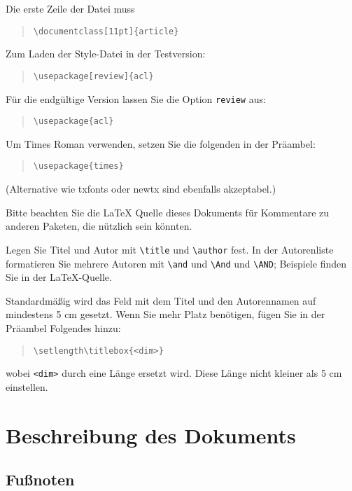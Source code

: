 \documentclass[11pt]{article}
\begin{document}
Die erste Zeile der Datei muss
\begin{quote}
\begin{verbatim}
\documentclass[11pt]{article}
\end{verbatim}
\end{quote}

Zum Laden der Style-Datei in der Testversion:
\begin{quote}
\begin{verbatim}
\usepackage[review]{acl}
\end{verbatim}
\end{quote}
Für die endgültige Version lassen Sie die Option \verb|review| aus:
\begin{quote}
\begin{verbatim}
\usepackage{acl}
\end{verbatim}
\end{quote}

Um Times Roman verwenden, setzen Sie die folgenden in der Präambel:
\begin{quote}
\begin{verbatim}
\usepackage{times}
\end{verbatim}
\end{quote}
(Alternative wie txfonts oder newtx sind ebenfalls akzeptabel.)

Bitte beachten Sie die \LaTeX{} Quelle dieses Dokuments für Kommentare zu anderen Paketen, die nützlich sein könnten.

Legen Sie Titel und Autor mit \verb|\title| und \verb|\author| fest. In der Autorenliste formatieren Sie mehrere Autoren mit \verb|\and| und \verb|\And| und \verb|\AND|; Beispiele finden Sie in der \LaTeX{}-Quelle.

Standardmäßig wird das Feld mit dem Titel und den Autorennamen auf mindestens 5 cm gesetzt. Wenn Sie mehr Platz benötigen, fügen Sie in der Präambel Folgendes hinzu:
\begin{quote}
\begin{verbatim}
\setlength\titlebox{<dim>}
\end{verbatim}
\end{quote}
wobei \verb|<dim>| durch eine Länge ersetzt wird. Diese Länge nicht kleiner als 5 cm einstellen.

\section{Beschreibung des Dokuments}

\subsection{Fußnoten}
\end{document}
